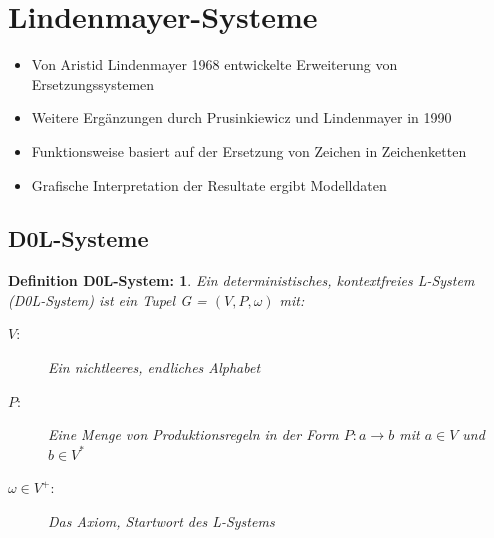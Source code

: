 
\newpage
\slidetitle{}
\section{Lindenmayer-Systeme \\}

\begin{itemize}
	\item Von Aristid Lindenmayer 1968 entwickelte Erweiterung von Ersetzungssystemen \\
	
	\item Weitere Ergänzungen durch Prusinkiewicz und Lindenmayer in 1990\\
	
	\item Funktionsweise basiert auf der Ersetzung von Zeichen in Zeichenketten \\
	
	\item Grafische Interpretation der Resultate ergibt Modelldaten
	
\end{itemize}





\newpage
{}

\subsection{D0L-Systeme\\ }
\newtheorem{defD0LSystem}{Definition D0L-System:}[subsection]
\begin{defD0LSystem}
	Ein deterministisches, kontextfreies L-System (D0L-System) ist ein Tupel G = $(V, P, \omega)$ mit:
	
	\begin{description}
		\item[\boldmath$V:$ ] Ein nichtleeres, endliches Alphabet\\
		
		\item[\boldmath$P:$ ] Eine Menge von Produktionsregeln in der Form $P: a \rightarrow b$ mit $a \in V$ und $b \in V^*$ \\
		
		\item[\boldmath$\omega \in V^+ :$ ]  Das Axiom, Startwort des L-Systems		
	\end{description}
\end{defD0LSystem}





